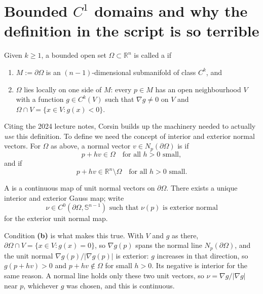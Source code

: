 
\section{Bounded \texorpdfstring{$C^1$}{C1} domains and why the definition in the script is so terrible}
\label{sec:bounded_c1_domains}

\begin{definition}
\label{def:bounded_ck_domain}
Given $k \geq 1$, a bounded open set $\Omega \subset \mathbb{R}^n$ is called a
 if
\begin{enumerate}[label=\textbf{(\alph*)}]
  \item $M := \partial\Omega$ is an $(n-1)$-dimensional submanifold of class $C^k$, and
  \item $\Omega$ lies locally on one side of $M$: every $p \in M$ has an open neighbourhood $V$
    with a function $g \in C^k(V)$ such that $\nabla g \neq 0$ on $V$ and
    $\Omega \cap V = \{x \in V : g(x) < 0\}$.
\end{enumerate}
\end{definition}

Citing the 2024 lecture notes, Corsin builds up the machinery needed to actually \emph{use}
this definition. To define  we need the concept of interior and exterior
normal vectors. For $\Omega$ as above, a normal vector $v \in N_p(\partial\Omega)$ is
 if
\[p + hv \in \Omega \quad \text{for all } h>0 \text{ small},\]
and  if
\[p + hv \in \mathbb{R}^n\setminus\Omega \quad \text{for all } h>0 \text{ small}.\]

A  is a continuous map of unit normal vectors on $\partial\Omega$. There
exists a unique interior and exterior Gauss map; write
\[\nu \in C^0(\partial\Omega, \mathbb{S}^{n-1}) \text{ such that } \nu(p) \text{ is exterior
  normal}\]
for the exterior unit normal map.

Condition \textbf{(b)} is what makes this true. With $V$ and $g$ as there,
$\partial\Omega \cap V = \{x \in V : g(x) = 0\}$, so $\nabla g(p)$ spans the normal line
$N_p(\partial\Omega)$, and the unit normal $\nabla g(p)/\lvert\nabla g(p)\rvert$ is exterior:
$g$ increases in that direction, so $g(p+hv) > 0$ and $p + hv \notin \Omega$ for small $h > 0$.
Its negative is interior for the same reason. A normal line holds only these two unit vectors,
so $\nu = \nabla g/\lvert\nabla g\rvert$ near $p$, whichever $g$ was chosen, and this is
continuous.

